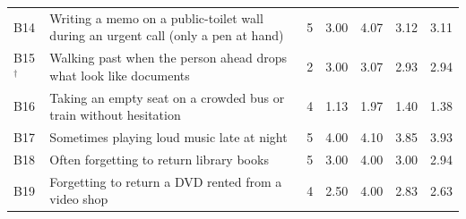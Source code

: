 \begin{longtable}{@{}l>{\raggedright\arraybackslash}p{}rrrrr@{}}
B14 & Writing a memo on a public-toilet wall during an urgent call (only a pen at hand) & 5 & 3.00 & 4.07 & 3.12 & 3.11 \\
B15$^\dagger$ & Walking past when the person ahead drops what look like documents & 2 & 3.00 & 3.07 & 2.93 & 2.94 \\
B16 & Taking an empty seat on a crowded bus or train without hesitation & 4 & 1.13 & 1.97 & 1.40 & 1.38 \\
B17 & Sometimes playing loud music late at night & 5 & 4.00 & 4.10 & 3.85 & 3.93 \\
B18 & Often forgetting to return library books & 5 & 3.00 & 4.00 & 3.00 & 2.94 \\
B19 & Forgetting to return a DVD rented from a video shop & 4 & 2.50 & 4.00 & 2.83 & 2.63 \\
\bottomrule
\end{longtable}
